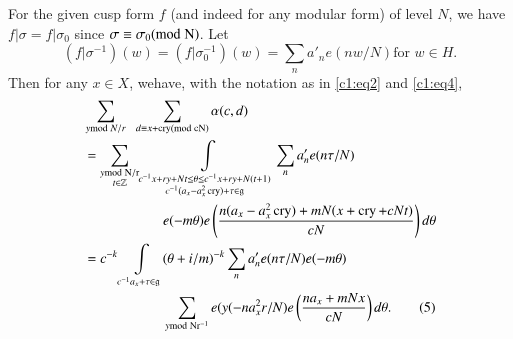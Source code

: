 For the given cusp form $f$ (and indeed for any modular form) of level
$N$, we have $f|\sigma=f|\sigma_{0}$ since $\sigma\equiv
\sigma_{0}(\rm{mod} \; N)$. Let
$$
(f|\sigma^{-1})(w)=(f|\sigma^{-1}_{0})(w)=\sum_{n}a'_{n}e(nw/N)\text{
  \ for \ } w\in H.
$$
Then for any $x\in X$, we\pageoriginale have, with the notation as in
\eqref{c1:eq2} and \eqref{c1:eq4},
\begin{align*}
& \sum_{y{\rm{mod}} \; N/r}  \;\; \sum_{d\equiv x+\operatorname{cry}(\rm{mod}\;
    cN)}\alpha(c,d)\\ 
&= \sum_{\substack{y\rm{mod}\;
      N/r\\ t\in\mathbb{Z}}}\int\limits_{\substack{c^{-1}x+ry+Nt\leq
      \theta\leq c^{-1}x+ry+N(t+1)\\ c^{-1}(a_{x}-a^{2}_{x}\operatorname{cry})+\tau
      \in\mathfrak{g}}}\sum_{n}a'_{n}e(n\tau/N)\\
&\hspace{2cm} e(-m\theta)e\left(\frac{n(a_{x}-a^{2}_{x}\operatorname{cry})+mN(x+\operatorname{cry}+cNt)}{cN}\right)d\theta\\
&= c^{-k}\int\limits_{c^{-1}a_{x}+\tau
    \in\mathfrak{g}} (\theta+i/m)^{-k} \sum_{n} a'_{n} e(n\tau/N)
  e(-m\theta)\\
&\hspace{2cm}\sum_{y\rm{mod} \; 
    Nr^{-1}} e(y(-na^{2}_{x}r/N) e\left(\frac{na_{x}+mNx}{cN}\right)
  d\theta. \tag{5}\label{c1:eq5}  
\end{align*}

